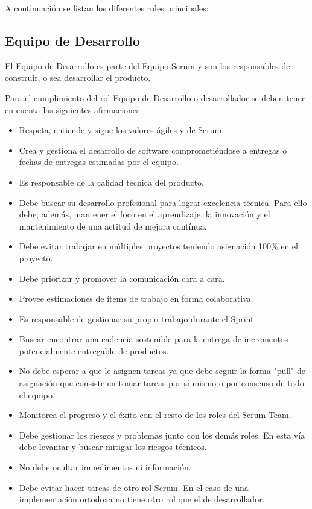 A continuación se listan los diferentes roles principales:

\subsection{Equipo de Desarrollo}

El Equipo de Desarrollo es parte del Equipo Scrum y son los responsables de construir, o sea desarrollar el producto.
 
Para el cumplimiento del rol Equipo de Desarrollo o desarrollador se deben tener en cuenta las siguientes afirmaciones:

\begin{itemize}
\item Respeta, entiende y sigue los valores ágiles y de Scrum.
\item Crea y gestiona el desarrollo de software comprometiéndose a entregas o fechas de entregas estimadas por el equipo.
\item Es responsable de la calidad técnica del producto.
\item Debe buscar su desarrollo profesional para lograr excelencia técnica. Para ello debe, además, mantener el foco en el aprendizaje, la innovación y el mantenimiento de una actitud de mejora contínua.
\item Debe evitar trabajar en múltiples proyectos teniendo asignación 100\% en el proyecto.
\item Debe priorizar y promover la comunicación cara a cara.
\item Provee estimaciones de ítems de trabajo en forma colaborativa. 
\item Es responsable de gestionar su propio trabajo durante el Sprint.
\item Buscar encontrar una cadencia sostenible para la entrega de incrementos potencialmente entregable de productos.
\item No debe esperar a que le asignen tareas ya que debe seguir la forma "pull" de asignación que consiste en tomar tareas por sí mismo o por consenso de todo el equipo.
\item Monitorea el progreso y el éxito con el resto de los roles del Scrum Team.
\item Debe gestionar los riesgos y problemas junto con los demás roles. En esta vía debe levantar y buscar mitigar los riesgos técnicos.
\item No debe ocultar impedimentos ni información.
\item Debe evitar hacer tareas de otro rol Scrum. En el caso de una implementación ortodoxa no tiene otro rol que el de desarrollador.

\end{itemize}
